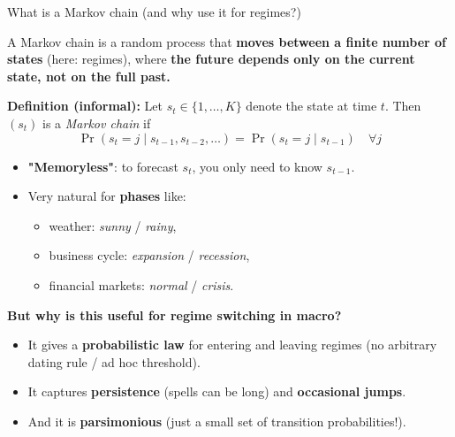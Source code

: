 \documentclass{beamer}
\begin{document}
\begin{frame}{What is a Markov chain (and why use it for regimes?)}
\footnotesize

A Markov chain is a random process that \textbf{moves between a finite number of states} (here: regimes), where\textbf{ the future depends only on the current state, not on the full past.}
\medskip

\textbf{Definition (informal):}
Let $s_t \in \{1,\dots,K\}$ denote the state at time $t$. Then $(s_t)$ is a \emph{Markov chain} if
\[
\Pr(s_t = j \mid s_{t-1}, s_{t-2},\dots)
= \Pr(s_t = j \mid s_{t-1}) \quad \forall j
\]

\begin{itemize}
  \item \textbf{"Memoryless"}: to forecast $s_t$, you only need to know $s_{t-1}$.
  \item Very natural for \textbf{phases} like:
        \begin{itemize}
        \footnotesize
          \item weather: \textit{sunny} / \textit{rainy},
          \item business cycle: \textit{expansion} / \textit{recession},
          \item financial markets: \textit{normal} / \textit{crisis}.
        \end{itemize}
\end{itemize}

\medskip

\textbf{But why is this useful for regime switching in macro?}
\begin{itemize}
  \item It gives a \textbf{probabilistic law} for entering and leaving regimes
        (no arbitrary dating rule / ad hoc threshold).
  \item It captures \textbf{persistence} (spells can be long) and \textbf{occasional jumps}.
  \item  And it is \textbf{parsimonious} (just a small set of transition probabilities!).
\end{itemize}

\end{frame}
\end{document}
